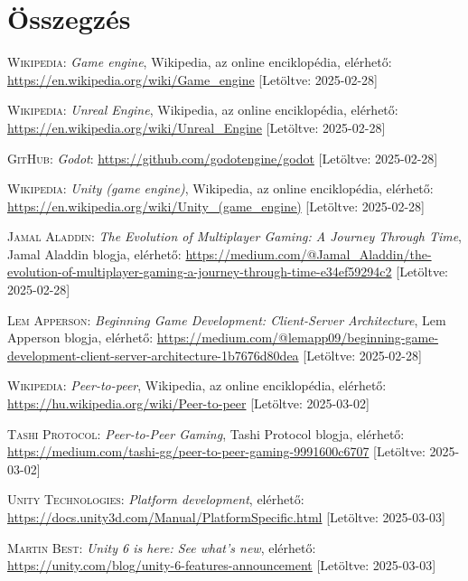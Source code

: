 \documentclass[]{thesis-ekf}
\theoremstyle{definition}
\theoremstyle{remark}
\begin{document}
\chapter*{Összegzés}

\begin{thebibliography}{2}
	\textsc{Wikipedia}: \emph{Game engine}, Wikipedia, az online enciklopédia, elérhető: \url{https://en.wikipedia.org/wiki/Game_engine} [Letöltve: 2025-02-28]
	
	\textsc{Wikipedia}: \emph{Unreal Engine}, Wikipedia, az online enciklopédia, elérhető: \url{https://en.wikipedia.org/wiki/Unreal_Engine} [Letöltve: 2025-02-28]
	
	\textsc{GitHub}: \emph{Godot}: \url{https://github.com/godotengine/godot} [Letöltve: 2025-02-28]
	
	\textsc{Wikipedia}: \emph{Unity (game engine)}, Wikipedia, az online enciklopédia, elérhető: \url{https://en.wikipedia.org/wiki/Unity_(game_engine)} [Letöltve: 2025-02-28]
	
	\textsc{Jamal Aladdin}: \emph{The Evolution of Multiplayer Gaming: A Journey Through Time}, Jamal Aladdin blogja, elérhető:
	\url{https://medium.com/@Jamal_Aladdin/the-evolution-of-multiplayer-gaming-a-journey-through-time-e34ef59294c2} [Letöltve: 2025-02-28]
	
	\textsc{Lem Apperson}: \emph{Beginning Game Development: Client-Server Architecture}, Lem Apperson blogja, elérhető:
	\url{https://medium.com/@lemapp09/beginning-game-development-client-server-architecture-1b7676d80dea} [Letöltve: 2025-02-28]
	
	\textsc{Wikipedia}: \emph{Peer-to-peer}, Wikipedia, az online enciklopédia, elérhető: \url{https://hu.wikipedia.org/wiki/Peer-to-peer} [Letöltve: 2025-03-02]
	
	\textsc{Tashi Protocol}: \emph{Peer-to-Peer Gaming}, Tashi Protocol blogja, elérhető:
	\url{https://medium.com/tashi-gg/peer-to-peer-gaming-9991600c6707} [Letöltve: 2025-03-02]
	
	\textsc{Unity Technologies}: \emph{Platform development}, elérhető:
	\url{https://docs.unity3d.com/Manual/PlatformSpecific.html} [Letöltve: 2025-03-03]
	
	\textsc{Martin Best}: \emph{Unity 6 is here: See what's new}, elérhető:
	\url{https://unity.com/blog/unity-6-features-announcement} [Letöltve: 2025-03-03]
	

\end{thebibliography}
\end{document}
